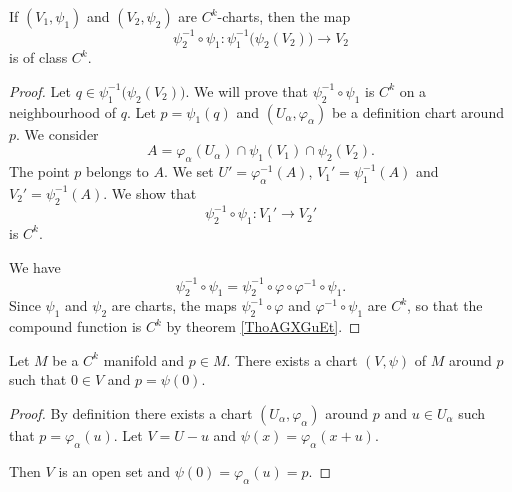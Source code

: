 \begin{proposition}      \label{PROPooUDVFooEJeluM}
    If \( (V_1,\psi_1)\) and \( (V_2,\psi_2)\) are \( C^k\)-charts, then the map
    \begin{equation}
        \psi_2^{-1}\circ \psi_1\colon \psi_1^{-1}\big( \psi_2(V_2) \big)\to V_2
    \end{equation}
    is of class \( C^k\).
\end{proposition}

\begin{proof}
    Let \( q\in \psi_1^{-1}\big( \psi_2(V_2) \big)\). We will prove that \( \psi_2^{-1}\circ\psi_1\) is \( C^k\) on a neighbourhood of \( q\).  Let \( p=\psi_1(q)\) and \( (U_{\alpha},\varphi_{\alpha})\) be a definition chart around \( p\). We consider
    \begin{equation}
        A=\varphi_{\alpha}(U_{\alpha})\cap\psi_1(V_1)\cap\psi_2(V_2).
    \end{equation}
    The point \( p\) belongs to \( A\). We set \( U'=\varphi_{\alpha}^{-1}(A)\), \( V_1'=\psi_1^{-1}(A)\) and \( V_2'=\psi_2^{-1}(A)\). We show that
    \begin{equation}
        \psi_2^{-1}\circ\psi_1\colon V_1'\to V_2'
    \end{equation}
    is \( C^k\).

    We have
    \begin{equation}
        \psi_2^{-1}\circ\psi_1=\psi_2^{-1}\circ\varphi\circ\varphi^{-1}\circ\psi_1.
    \end{equation}
    Since \( \psi_1\) and \( \psi_2\) are charts, the maps \( \psi_2^{-1}\circ \varphi\) and \( \varphi^{-1}\circ\psi_1\) are \( C^k\), so that the compound function is \( C^k\) by theorem \ref{ThoAGXGuEt}.
\end{proof}

\begin{lemma}       \label{LEMooOPPJooXezOHS}
    Let \( M\) be a \( C^k\) manifold and \( p\in M\). There exists a chart \( (V,\psi)\) of \( M\) around \( p\) such that \( 0\in V\) and \( p=\psi(0)\).
\end{lemma}

\begin{proof}
    By definition there exists a chart \( (U_{\alpha},\varphi_{\alpha})\) around \( p\) and \( u\in U_{\alpha}\) such that \( p=\varphi_{\alpha}(u)\). Let \( V=U-u\) and \( \psi(x)=\varphi_{\alpha}(x+u)\).

    Then \( V\) is an open set and \( \psi(0)=\varphi_{\alpha}(u)=p\).
\end{proof}

